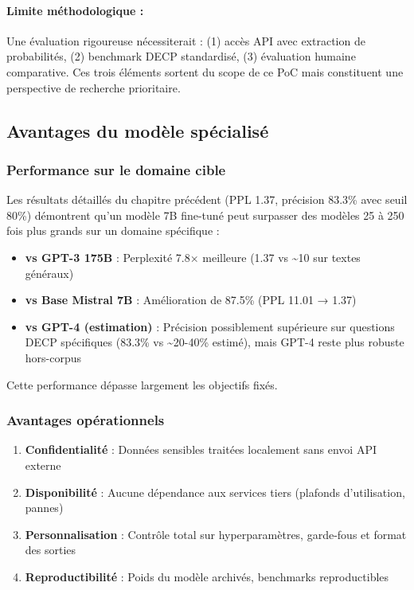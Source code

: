 \paragraph{Limite méthodologique :}
Une évaluation rigoureuse nécessiterait : (1) accès API avec extraction de probabilités, (2) benchmark DECP standardisé, (3) évaluation humaine comparative. Ces trois éléments sortent du scope de ce PoC mais constituent une perspective de recherche prioritaire.

\subsection{Avantages du modèle spécialisé}

\subsubsection{Performance sur le domaine cible}

Les résultats détaillés du chapitre précédent (PPL 1.37, précision 83.3\% avec seuil 80\%) démontrent qu'un modèle 7B fine-tuné peut surpasser des modèles 25 à 250 fois plus grands sur un domaine spécifique :

\begin{itemize}
    \item \textbf{vs GPT-3 175B} : Perplexité 7.8× meilleure (1.37 vs \textasciitilde{}10 sur textes généraux)
    \item \textbf{vs Base Mistral 7B} : Amélioration de 87.5\% (PPL 11.01 → 1.37)
    \item \textbf{vs GPT-4 (estimation)} : Précision possiblement supérieure sur questions DECP spécifiques (83.3\% vs \textasciitilde{}20-40\% estimé), mais GPT-4 reste plus robuste hors-corpus
\end{itemize}

Cette performance dépasse largement les objectifs fixés.

\subsubsection{Avantages opérationnels}

\begin{enumerate}
    \item \textbf{Confidentialité} : Données sensibles traitées localement sans envoi API externe
    \item \textbf{Disponibilité} : Aucune dépendance aux services tiers (plafonds d'utilisation, pannes)
    \item \textbf{Personnalisation} : Contrôle total sur hyperparamètres, garde-fous et format des sorties
    \item \textbf{Reproductibilité} : Poids du modèle archivés, benchmarks reproductibles
\end{enumerate}

